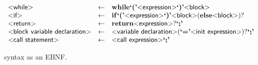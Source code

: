 \begin{figure}[h!]
\[\begin{array}{lcl}
  \text{\sf\textless while\textgreater} & \gets & \mathbf{while} \text{\bf`('} \text{\sf\textless expression\textgreater} \text{\bf`)'} \text{\sf\textless block\textgreater}\\

  \text{\sf\textless if\textgreater} & \gets & \mathbf{if} \text{\bf`('} \text{\sf\textless expression\textgreater} \text{\bf`)'} \text{\sf\textless block\textgreater}
  (\mathbf{else} \text{\sf\textless block\textgreater})?\\

  \text{\sf\textless return\textgreater} & \gets & \mathbf{return} \text{\sf\textless expression\textgreater}? \text{\bf`;'}\\

  \text{\sf\textless block variable declaration\textgreater} & \gets &
  \text{\sf\textless variable declaration\textgreater} (\text{\bf`='} \text{\sf\textless init expression\textgreater})? \text{\bf`;'}\\

  \text{\sf\textless call statement\textgreater} & \gets & \text{\sf\textless call expression\textgreater} \text{\bf`;'}\\

\end{array}
\]
  \caption {\pencil{} syntax as an EBNF.}
  \label{fig:pencil-syntax}
\end{figure}

